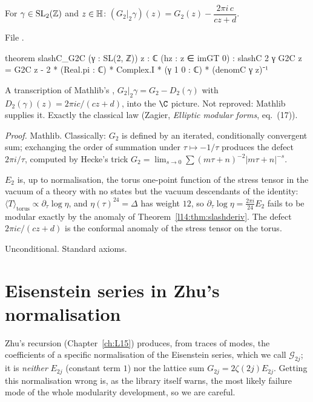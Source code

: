 \begin{theorem}\label{l14:thm:G2slash}
For $\gamma\in\mathrm{SL}_2(\mathbb{Z})$ and $z\in\mathbb{H}$: $(G_2|_2\gamma)(z) = G_2(z) - \dfrac{2\pi i\,c}{cz+d}$.
\end{theorem}
\noindent File .
\begin{leancode}
theorem slashC_G2C (γ : SL(2, ℤ)) {z : ℂ} (hz : z ∈ imGT 0) :
    slashC 2 γ G2C z
      = G2C z - 2 * (Real.pi : ℂ) * Complex.I * (γ 1 0 : ℂ) * (denomC γ z)⁻¹
\end{leancode}
\begin{dictionary}
A transcription of Mathlib's , $G_2|_2\gamma = G_2 - D_2(\gamma)$ with
$D_2(\gamma)(z) = 2\pi i c/(cz+d)$, into the $\C$ picture. Not reproved: Mathlib supplies it. Exactly the classical law
(Zagier, \emph{Elliptic modular forms}, eq.~(17)).
\end{dictionary}
\noindent\emph{Proof.} Mathlib. Classically: $G_2$ is defined by an iterated, conditionally convergent sum; exchanging the
order of summation under $\tau\mapsto-1/\tau$ produces the defect $2\pi i/\tau$, computed by Hecke's trick
$G_2 = \lim_{s\to0}\sum(m\tau+n)^{-2}|m\tau+n|^{-s}$.
\begin{physics}
$E_2$ is, up to normalisation, the torus one-point function of the stress tensor in the vacuum of a theory with no
states but the vacuum descendants of the identity: $\langle T\rangle_{\text{torus}}\propto\partial_\tau\log\eta$, and
$\eta(\tau)^{24}=\Delta$ has weight $12$, so $\partial_\tau\log\eta = \frac{2\pi i}{24}E_2$ fails to be modular exactly by
the anomaly of Theorem~\ref{l14:thm:slashderiv}. The defect $2\pi ic/(cz+d)$ is the conformal anomaly of the stress tensor
on the torus.
\end{physics}
\begin{status}
Unconditional. Standard axioms.
\end{status}

\section{Eisenstein series in Zhu's normalisation}\label{l14:sec:eis}

Zhu's recursion (Chapter~\ref{ch:L15}) produces, from traces of modes, the coefficients of a specific normalisation of the
Eisenstein series, which we call $\mathcal G_{2j}$; it is \emph{neither} $E_{2j}$ (constant term $1$) nor the lattice sum
$G_{2j} = 2\zeta(2j)E_{2j}$. Getting this normalisation wrong is, as the library itself warns, the most likely failure mode
of the whole modularity development, so we are careful.

